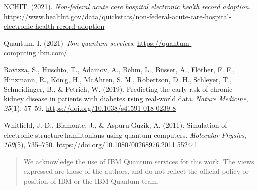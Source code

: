 \documentclass{scrartcl}
\begin{document}
\begin{hangparas}{1.5em}{1}
\hypertarget{citeproc_bib_item_9}{NCHIT. (2021). \textit{Non-federal acute care hospital electronic health record adoption}. \url{https://www.healthit.gov/data/quickstats/non-federal-acute-care-hospital-electronic-health-record-adoption}}

\hypertarget{citeproc_bib_item_10}{Quantum, I. (2021). \textit{Ibm quantum services}. \url{https://quantum-computing.ibm.com/}}

\hypertarget{citeproc_bib_item_11}{Ravizza, S., Huschto, T., Adamov, A., Böhm, L., Büsser, A., Flöther, F. F., Hinzmann, R., König, H., McAhren, S. M., Robertson, D. H., Schleyer, T., Schneidinger, B., \& Petrich, W. (2019). Predicting the early risk of chronic kidney disease in patients with diabetes using real-world data. \textit{Nature Medicine}, \textit{25}(1), 57–59. \url{https://doi.org/10.1038/s41591-018-0239-8}}

\hypertarget{citeproc_bib_item_12}{Whitfield, J. D., Biamonte, J., \& Aspuru-Guzik, A. (2011). Simulation of electronic structure hamiltonians using quantum computers. \textit{Molecular Physics}, \textit{109}(5), 735–750. \url{https://doi.org/10.1080/00268976.2011.552441}}
\end{hangparas}

\begin{quote}
We acknowledge the use of IBM Quantum services for this work. The views expressed are those of the authors, and do not reflect the official policy or position of IBM or the IBM Quantum team.
\end{quote}
\end{document}

